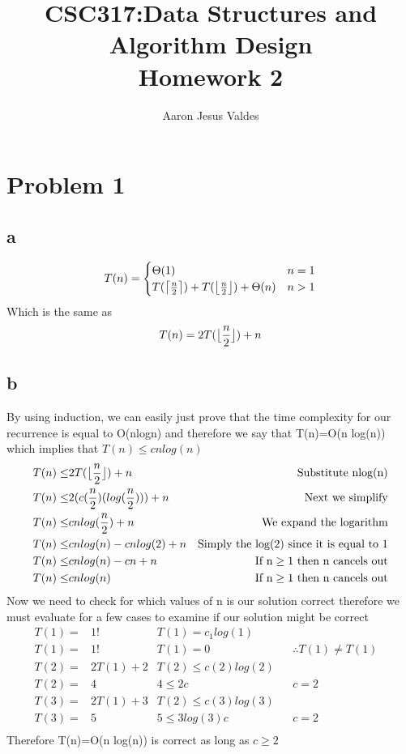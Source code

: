 \documentclass[11pt]{article}
\title{\Huge{CSC317:Data Structures and Algorithm Design}\\\LARGE{Homework 2}}
\author{Aaron Jesus Valdes}
\DeclarePairedDelimiter\ceil{\lceil}{\rceil}
\DeclarePairedDelimiter\floor{\lfloor}{\rfloor}
\begin{document}
	\maketitle
	\clearpage
	\onehalfspacing
	\clearpage
	\section*{Problem 1}
		\subsection*{a}
			\begin{equation}
				T(n)=\begin{cases}
						\Theta(1) & n=1 \\
						T(\ceil[\big]{\frac{n}{2}})+T(\floor[\big]{\frac{n}{2}}) + \Theta(n) & n>1
					 \end{cases}
			\end{equation}
			Which is the same as
			\begin{equation}
			T(n)=2T(\floor[\big]{\frac{n}{2}}) + n
			\end{equation}
		\subsection*{b}
			By using induction, we can easily just prove that the time complexity for our recurrence is equal to O(nlogn) and therefore we say that T(n)=O(n log(n)) which implies that $T(n)\le c n log(n)$
			\\
			\begin{align}
				T(n)\le&2T(\floor[\big]{\frac{n}{2}}) + n &\text{Substitute nlog(n)}\\
				T(n)\le&2(c(\frac{n}{2})(log(\frac{n}{2})))+ n & \text{Next we simplify}\\
				T(n)\le&cnlog(\frac{n}{2})+ n & \text{We expand the logarithm}\\
				T(n)\le&cnlog(n)-cnlog(2) +n &\text{Simply the log(2) since it is equal to 1}\\
				T(n)\le&cnlog(n)-cn +n &\text{If n}\ge 1\text{ then n cancels out}\\
				T(n)\le&cnlog(n)&\text{If n}\ge 1\text{ then n cancels out}\\
			\end{align}
			Now we need to check for which values of n is our solution correct therefore we must evaluate for a few cases to examine if our solution might be correct
			\\
			\begin{align}
				T(1)=&1! & T(1)=c_1 log(1)\\
				T(1)=&1! & T(1)=0 & &\therefore T(1)\ne T(1)&\\
				T(2)=&2T(1)+2&T(2)\le c(2)log(2)\\
				T(2)=&4&4\le 2c&&c=2&\\
				T(3)=&2T(1)+3&T(2)\le c(3)log(3)\\
				T(3)=&5&5\le 3log(3)c&&c=2&\\
			\end{align}
			Therefore T(n)=O(n log(n)) is correct as long as $c\ge2$
			\newpage
\end{document}
